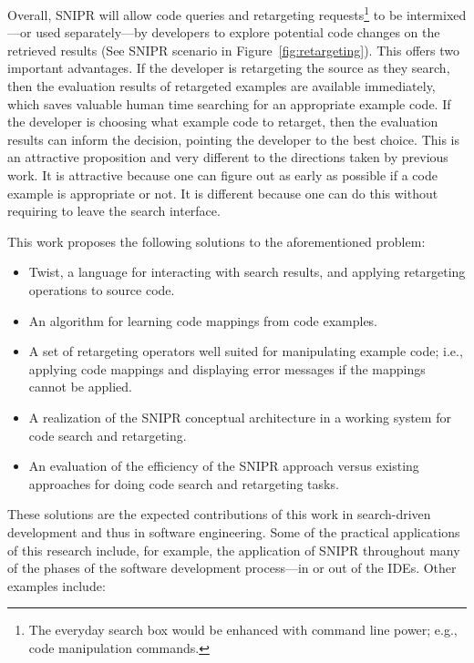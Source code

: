 Overall, \uppercase{SnipR} will allow code queries and retargeting requests\footnote{The everyday search box would be enhanced with command line power; e.g., code manipulation commands.} to be intermixed---or used separately---by developers to explore potential code changes on the retrieved results (See \uppercase{SnipR} scenario in Figure~\ref{fig:retargeting}). This offers two important advantages. If the developer is retargeting the source as they search, then the evaluation results of retargeted examples are available immediately, which saves valuable human time searching for an appropriate example code. If the developer is choosing what example code to retarget, then the evaluation results can inform the decision, pointing the developer to the best choice. This is an attractive proposition and very different to the directions taken by previous work. It is attractive because one can figure out as early as possible if a code example is appropriate or not. It is different because one can do this without requiring to leave the search interface.

This work proposes the following solutions to the aforementioned problem:

\begin{itemize}
\item Twist, a language for interacting with search results, and applying retargeting operations to source code.
\item An algorithm for learning code mappings from code examples. 
\item A set of retargeting operators well suited for manipulating example code; i.e., applying code mappings and displaying error messages if the mappings cannot be applied.
\item A realization of the \uppercase{SnipR} conceptual architecture in a working system for code search and retargeting. 
\item An evaluation of the efficiency of the \uppercase{SnipR} approach versus existing approaches for doing code search and retargeting tasks. 
\end{itemize}

These solutions are the expected contributions of this work in search-driven development and thus in software engineering. Some of the practical applications of this research include, for example, the application of \uppercase{SnipR} throughout many of the phases of the software development process---in or out of the IDEs. Other examples include: 


